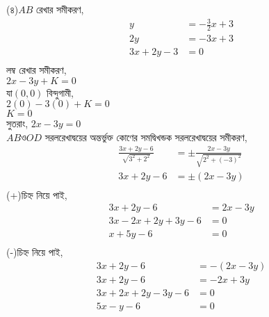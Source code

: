 \documentclass{article}
\begin{document}
(৪)$AB$ রেখার সমীকরণ,\\
\begin{align*}
	y&=-\frac{3}{2}x+3\\
	2y&=-3x+3\\
	3x+2y-3&=0\\
\end{align*} 
লম্ব রেখার সমীকরণ,\\ 
$2x-3y+K=0$\\
যা$(0,0)$ বিন্দুগামী,\\
$2(0)-3(0)+K=0$\\
$K=0$\\
সুতরাং, $2x-3y=0$\\ 
$AB$ও$OD$  সরলরেখাদ্বয়ের অন্তর্ভুক্ত কোণের সমদ্বিখন্ডক সরলরেখাদ্বয়ের সমীকরণ,\\
\begin{align*}
\frac{3x+2y-6}{\sqrt{3^2+2^2}}&=\pm\frac{2x-3y}{\sqrt{2^2+(-3)^2}}\\
3x+2y-6&=\pm(2x-3y)\\
\end{align*}
(+)চিহ্ন নিয়ে পাই,\\
\begin{align*}
	3x+2y-6&=2x-3y\\
	3x-2x+2y+3y-6&=0\\
	x+5y-6&=0\\
\end{align*}
(-)চিহ্ন নিয়ে পাই,\\
\begin{align*}
	3x+2y-6&=-(2x-3y)\\
	3x+2y-6&=-2x+3y\\
	3x+2x+2y-3y-6&=0\\
	5x-y-6&=0\\
\end{align*}  
\end{document}
